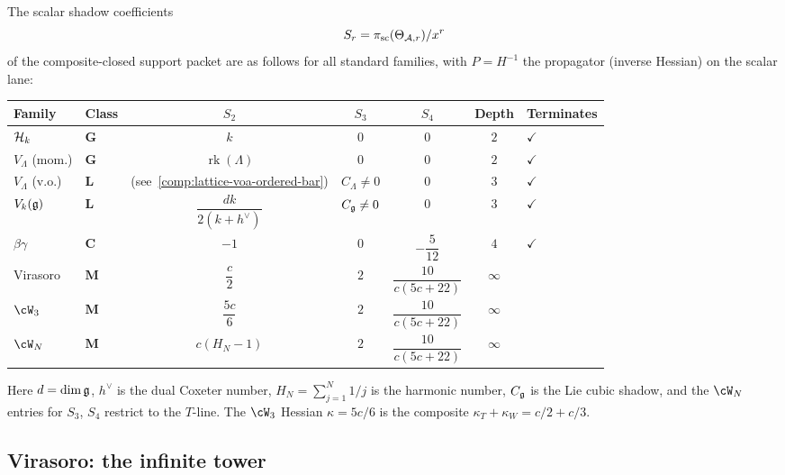 \begin{computation}%
\label{comp:shadow-tower-atlas}%
%
The scalar shadow coefficients
\[
S_r=\pi_{\mathrm{sc}}(\Theta_{\mathcal{A},r})/x^r
\]
of the composite-closed support packet are as follows for all standard
families, with $P = H^{-1}$ the propagator
\textup{(}inverse Hessian\textup{)} on the scalar lane:

\begin{center}
\small
\renewcommand{\arraystretch}{1.4}
\begin{tabular}{llccccl}
\toprule
\textbf{Family} & \textbf{Class}
& $S_2$ & $S_3$ & $S_4$
& \textbf{Depth} & \textbf{Terminates} \\
\midrule
$\mathcal{H}_k$
 & $\mathbf{G}$
 & $k$
 & $0$
 & $0$
 & $2$
 & $\checkmark$ \\[2pt]
$V_\Lambda$ (mom.)
 & $\mathbf{G}$
 & $\operatorname{rk}(\Lambda)$
 & $0$
 & $0$
 & $2$
 & $\checkmark$ \\[2pt]
$V_\Lambda$ (v.o.)
 & $\mathbf{L}$
 & (see~\ref{comp:lattice-voa-ordered-bar})
 & $C_\Lambda \ne 0$
 & $0$
 & $3$
 & $\checkmark$ \\[2pt]
$V_k(\mathfrak{g})$
 & $\mathbf{L}$
 & $\dfrac{dk}{2(k+h^\vee)}$
 & $C_{\mathfrak{g}}\ne 0$
 & $0$
 & $3$
 & $\checkmark$ \\[4pt]
$\beta\gamma$
 & $\mathbf{C}$
 & $-1$
 & $0$
 & $-\dfrac{5}{12}$
 & $4$
 & $\checkmark$ \\[4pt]
Virasoro
 & $\mathbf{M}$
 & $\dfrac{c}{2}$
 & $2$
 & $\dfrac{10}{c(5c{+}22)}$
 & $\infty$
 & \\[4pt]
$\cW_3$
 & $\mathbf{M}$
 & $\dfrac{5c}{6}$
 & $2$
 & $\dfrac{10}{c(5c{+}22)}$
 & $\infty$
 & \\[4pt]
$\cW_N$
 & $\mathbf{M}$
 & $c(H_N{-}1)$
 & $2$
 & $\dfrac{10}{c(5c{+}22)}$
 & $\infty$
 & \\
\bottomrule
\end{tabular}
\end{center}
Here $d = \dim\mathfrak{g}$, $h^\vee$ is the dual Coxeter number,
$H_N = \sum_{j=1}^N 1/j$ is the harmonic number,
$C_{\mathfrak{g}}$ is the Lie cubic shadow, and the $\cW_N$ entries
for $S_3$, $S_4$ restrict to the $T$-line. The
$\cW_3$ Hessian $\kappa = 5c/6$ is the composite
$\kappa_T + \kappa_W = c/2 + c/3$.
\end{computation}

\subsection{Virasoro: the infinite tower}%
\label{subsec:virasoro-shadow-tower}%

